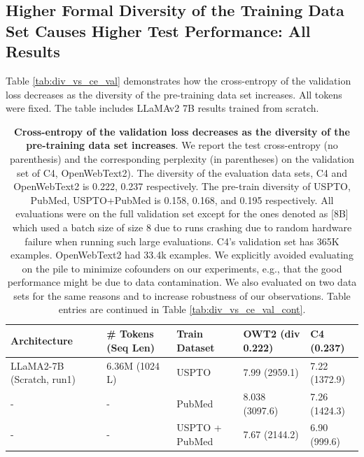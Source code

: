 \subsection{Higher Formal Diversity of the Training Data Set Causes Higher Test Performance: All Results}
Table \ref{tab:div_vs_ce_val} demonstrates how the cross-entropy of the validation loss decreases as the diversity of the pre-training data set increases. 
All tokens were fixed. 
The table includes LLaMAv2 7B results trained from scratch.

\begin{table}[h]
\caption{\textbf{Cross-entropy of the validation loss decreases as the diversity of the pre-training data set increases}. 
We report the test cross-entropy (no parenthesis) and the corresponding perplexity (in parentheses) on the validation set of C4, OpenWebText2).
The diversity of the evaluation data sets, C4 and OpenWebText2 is 0.222, 0.237 respectively. 
The pre-train diversity of USPTO, PubMed, USPTO+PubMed is 0.158, 0.168, and 0.195 respectively.
All evaluations were on the full validation set except for the ones denoted as [8B] which used a batch size of size 8 due to runs crashing due to random hardware failure when running such large evaluations. 
C4's validation set has 365K examples. 
OpenWebText2 had 33.4k examples. 
We explicitly avoided evaluating on the pile to minimize cofounders on our experiments, e.g., that the good performance might be due to data contamination. 
We also evaluated on two data sets for the same reasons and to increase robustness of our observations. Table entries are continued in Table \ref{tab:div_vs_ce_val_cont}.
}
\vspace{10pt}
\centering
\begin{tabularx}{1\textwidth}{lXXXX} 
\bottomrule 
Architecture & \# Tokens (Seq Len) & Train Dataset  & OWT2 (\textbf{div 0.222})  & C4 (\textbf{0.237}) \\
\bottomrule 

LLaMA2-7B (Scratch, run1) & 6.36M (1024 L) & USPTO  & 7.99 (2959.1) & 7.22 (1372.9) \\ %
- & - & PubMed & 8.038 (3097.6) & 7.26 (1424.3) \\ %
- & - & USPTO + PubMed & 7.67 (2144.2) & 6.90 (999.6) \\ %
\hline


\end{tabularx}
\end{table}
